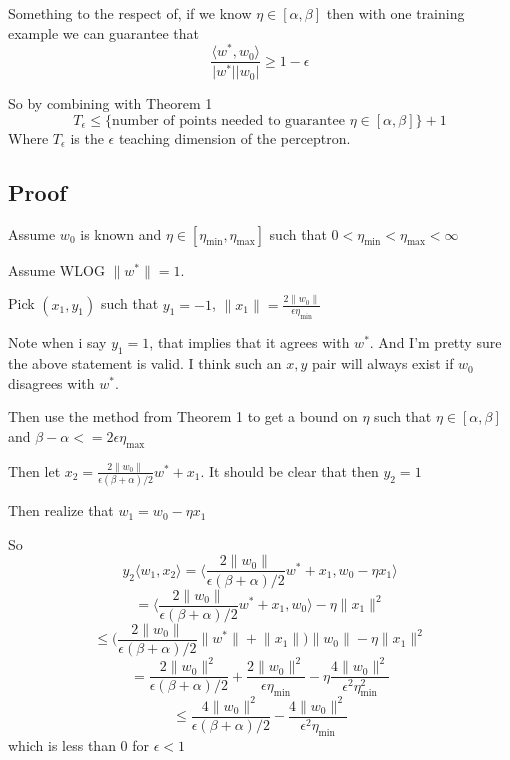 \documentclass{article}
\begin{document}
Something to the respect of, if we know $\eta \in [\alpha, \beta]$ then with one training example we can guarantee that
$$
\frac{\langle w^*, w_0 \rangle}{\lvert w^* \rvert \lvert w_0 \rvert} \geq 1 - \epsilon
$$

So by combining with Theorem 1
$$
T_\epsilon \leq \{\text{number of points needed to guarantee } \eta \in [\alpha, \beta]\} +1 
$$
Where $T_\epsilon$ is the $\epsilon$ teaching dimension of the perceptron.
\color{black}

\subsection*{Proof}


Assume $w_0$ is known and $\eta \in [\eta_{\min} , \eta_{\max}] $ such that 
$0 < \eta_{\min} < \eta_{\max} < \infty$

Assume WLOG $\lVert w^* \rVert = 1$.

Pick $(x_1,y_1)$ such that $y_1 = -1$, $\lVert x_1 \rVert = \frac{2 \lVert w_0 \rVert}{\epsilon \eta_{\min}}$

\color{red}
Note when i say $y_1 = 1$, that implies that it agrees with $w^*$. And I'm pretty 
sure the above statement is valid. I think such an $x,y$ pair will always exist if
$w_0$ disagrees with $w^*$.
\color{black}

Then use the method from Theorem 1 to get a bound on $\eta$ such that $\eta \in [\alpha , \beta]$ and $\beta - \alpha <= 2\epsilon \eta_{\max}$

Then let $x_2 = \frac{2 \lVert w_0 \rVert}{\epsilon (\beta + \alpha)/2}w^* + x_1$.
It should be clear that then $y_2 = 1$

Then realize that
$w_1 = w_0 - \eta x_1$

So
$$
y_2 \langle w_1, x_2 \rangle  = \bigg\langle \frac{2 \lVert w_0 \rVert}{\epsilon (\beta + \alpha) /2} w^* + x_1 , w_0 - \eta x_1 \bigg\rangle
$$
$$
= \bigg\langle \frac{2 \lVert w_0 \rVert}{\epsilon (\beta + \alpha) /2} w^* + x_1 , w_0  \bigg\rangle - \eta \lVert x_1 \rVert^2
$$
$$
\leq \bigg( \frac{2 \lVert w_0 \rVert}{\epsilon (\beta + \alpha) /2} \lVert w^* \rVert + \lVert x_1 \rVert \bigg ) \lVert w_0 \rVert - \eta \lVert x_1 \rVert^2
$$
$$
= \frac{2 \lVert w_0 \rVert^2}{\epsilon (\beta + \alpha)/2} + \frac{2 \lVert w_0 \rVert ^2}{\epsilon \eta_{\min}} - \eta \frac{4 \lVert w_0 \rVert^2}{\epsilon^2 \eta_{\min}^2}
$$
$$
\leq \frac{4 \lVert w_0 \rVert^2}{\epsilon (\beta + \alpha)/2}  -  \frac{4 \lVert w_0 \rVert^2}{\epsilon^2 \eta_{\min}}
$$
which is less than $0$ for $\epsilon < 1$
\end{document}
